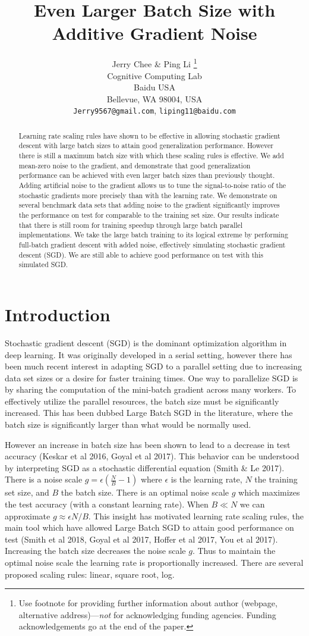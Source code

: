 \documentclass{article} %
\title{Even Larger Batch Size with \\Additive Gradient Noise}
\author{Jerry Chee \& Ping Li \thanks{ Use footnote for providing further information
about author (webpage, alternative address)---\emph{not} for acknowledging
funding agencies.  Funding acknowledgements go at the end of the paper.} \\
Cognitive Computing Lab\\
Baidu USA\\
Bellevue, WA 98004, USA \\
\texttt{Jerry9567@gmail.com}, \texttt{liping11@baidu.com} \\
}
\begin{document}
\maketitle

\begin{abstract}
Learning rate scaling rules have shown to be effective in allowing stochastic gradient descent with large batch sizes to attain good generalization performance.
However there is still a maximum batch size with which these scaling rules is effective. 
We add mean-zero noise to the gradient, and demonstrate that good generalization performance can be achieved with even larger batch sizes than previously thought. 
Adding artificial noise to the gradient allows us to tune the signal-to-noise ratio of the stochastic gradients more precisely than with the learning rate.
We demonstrate on several benchmark data sets that adding noise to the gradient significantly improves the performance on test for comparable to the training set size. 
Our results indicate that there is still room for training speedup through large batch parallel implementations.%
We take the large batch training to its logical extreme by performing full-batch gradient descent with added noise, effectively simulating stochastic gradient descent (SGD).
We are still able to achieve good performance on test with this simulated SGD.
\end{abstract}

\section{Introduction}
Stochastic gradient descent (SGD) is the dominant optimization algorithm in deep learning.
It was originally developed in a serial setting, however there has been much recent interest in adapting SGD to a parallel setting due to increasing data set sizes or a desire for faster training times.
One way to parallelize SGD is by sharing the computation of the mini-batch gradient across many workers.
To effectively utilize the parallel resources, the batch size must be significantly increased.
This has been dubbed Large Batch SGD in the literature, where the batch size is significantly larger than what would be normally used.

However an increase in batch size has been shown to lead to a decrease in test accuracy (Keskar et al 2016, Goyal et al 2017).
This behavior can be understood by interpreting SGD as a stochastic differential equation (Smith \& Le 2017). 
There is a noise scale $g = \epsilon ( \frac{N}{B} - 1 )$ where $\epsilon$ is the learning rate, $N$ the training set size, and $B$ the batch size.
There is an optimal noise scale $g$ which maximizes the test accuracy (with a constant learning rate).
When $B \ll N$ we can approximate $g \approx \epsilon N / B$.
This insight has motivated learning rate scaling rules, the main tool which have allowed Large Batch SGD to attain good performance on test (Smith et al 2018, Goyal et al 2017, Hoffer et al 2017, You et al 2017).
Increasing the batch size decreases the noise scale $g$.
Thus to maintain the optimal noise scale the learning rate is proportionally increased.
There are several proposed scaling rules: linear, square root, log.
\end{document}

